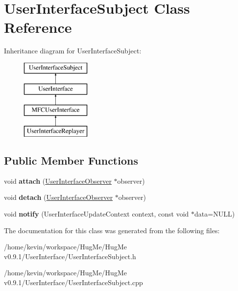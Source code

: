 \hypertarget{classUserInterfaceSubject}{
\section{UserInterfaceSubject Class Reference}
\label{classUserInterfaceSubject}
}
Inheritance diagram for UserInterfaceSubject:\begin{figure}[H]
\begin{center}
\leavevmode
\includegraphics[height=4.000000cm]{classUserInterfaceSubject}
\end{center}
\end{figure}
\subsection*{Public Member Functions}
\begin{DoxyCompactItemize}
\item 
\hypertarget{classUserInterfaceSubject_ac7883808bd4089614b378a8a5309b9c5}{
void {\bfseries attach} (\hyperlink{classUserInterfaceObserver}{UserInterfaceObserver} $\ast$observer)}
\label{classUserInterfaceSubject_ac7883808bd4089614b378a8a5309b9c5}

\item 
\hypertarget{classUserInterfaceSubject_a6b897c262b4f349da028dd91a8683d7e}{
void {\bfseries detach} (\hyperlink{classUserInterfaceObserver}{UserInterfaceObserver} $\ast$observer)}
\label{classUserInterfaceSubject_a6b897c262b4f349da028dd91a8683d7e}

\item 
\hypertarget{classUserInterfaceSubject_a42cbee9b83c54ca6c92d66b0385b2925}{
void {\bfseries notify} (UserInterfaceUpdateContext context, const void $\ast$data=NULL)}
\label{classUserInterfaceSubject_a42cbee9b83c54ca6c92d66b0385b2925}

\end{DoxyCompactItemize}


The documentation for this class was generated from the following files:\begin{DoxyCompactItemize}
\item 
/home/kevin/workspace/HugMe/HugMe v0.9.1/UserInterface/UserInterfaceSubject.h\item 
/home/kevin/workspace/HugMe/HugMe v0.9.1/UserInterface/UserInterfaceSubject.cpp\end{DoxyCompactItemize}
